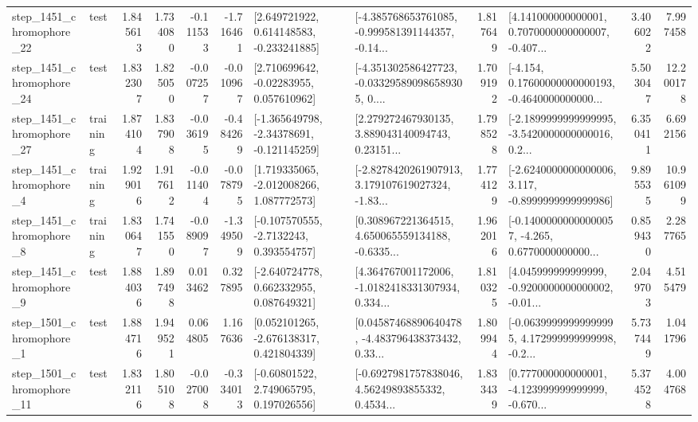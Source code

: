 \begin{tabular}{llrrrrllrlrr}
 step\_1451\_chromophore\_22 &      test &      1.845613 &    1.734080 &     -0.111533 & -1.716461 &    [2.649721922, 0.614148583, -0.233241885] &  [-4.385768653761085, -0.999581391144357, -0.14... &       1.817649 &  [4.141000000000001, 0.7070000000000007, -0.407... &            3.406022 &          7.997458 \\
 step\_1451\_chromophore\_24 &      test &      1.832307 &    1.825050 &     -0.007257 & -0.010967 &     [2.710699642, -0.02283955, 0.057610962] &  [-4.351302586427723, -0.033295890986589305, 0.... &       1.709192 &  [-4.154, 0.17600000000000193, -0.4640000000000... &            5.503047 &         12.200178 \\
 step\_1451\_chromophore\_27 &  training &      1.874104 &    1.837908 &     -0.036195 & -0.484269 &   [-1.365649798, -2.34378691, -0.121145259] &  [2.279272467930135, 3.889043140094743, 0.23151... &       1.798528 &  [-2.1899999999999995, -3.5420000000000016, 0.2... &            6.350411 &          6.692156 \\
  step\_1451\_chromophore\_4 &  training &      1.929016 &    1.917612 &     -0.011404 & -0.078795 &    [1.719335065, -2.012008266, 1.087772573] &  [-2.8278420261907913, 3.179107619027324, -1.83... &       1.774129 &  [-2.6240000000000006, 3.117, -0.8999999999999986] &            9.895535 &         10.961099 \\
  step\_1451\_chromophore\_8 &  training &      1.830647 &    1.741550 &     -0.089097 & -1.349509 &     [-0.107570555, -2.7132243, 0.393554757] &  [0.308967221364515, 4.650065559134188, -0.6335... &       1.962016 &  [-0.14000000000000057, -4.265, 0.6770000000000... &            0.859430 &          2.287765 \\
  step\_1451\_chromophore\_9 &      test &      1.884036 &    1.897498 &      0.013462 &  0.327895 &    [-2.640724778, 0.662332955, 0.087649321] &  [4.364767001172006, -1.0182418331307934, 0.334... &       1.810325 &  [4.045999999999999, -0.9200000000000002, -0.01... &            2.049703 &          4.515479 \\
  step\_1501\_chromophore\_1 &      test &      1.884716 &    1.949521 &      0.064805 &  1.167636 &    [0.052101265, -2.676138317, 0.421804339] &  [0.04587468890640478, -4.483796438373432, 0.33... &       1.809944 &  [-0.06399999999999995, 4.172999999999998, -0.2... &            5.737449 &          1.041796 \\
 step\_1501\_chromophore\_11 &      test &      1.832116 &    1.805108 &     -0.027008 & -0.334013 &     [-0.60801522, 2.749065795, 0.197026556] &  [-0.6927981757838046, 4.56249893855332, 0.4534... &       1.833439 &  [0.777000000000001, -4.123999999999999, -0.670... &            5.374528 &          4.004768 \\

\end{tabular}
